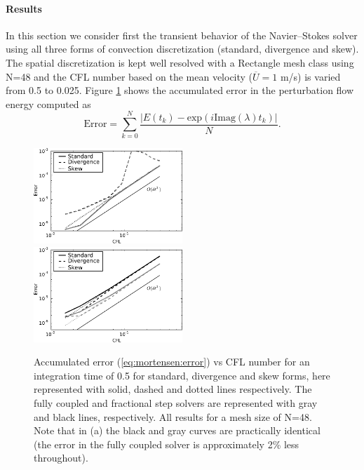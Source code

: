 \paragraph{Results}
In this section we consider first the transient behavior of the Navier--Stokes solver using all three forms of convection discretization (standard, divergence and skew). The spatial discretization is kept well resolved with a Rectangle mesh class using N=48 and the CFL number based on the mean velocity ($\overline{U}=1$ m/s) is varied from 0.5 to 0.025. Figure \ref{fig:mortensen:OS_init_cfl}  shows the accumulated error in the perturbation flow energy computed as
\begin{equation}
 \text{Error} = \sum_{k=0}^N \frac{|E(t_k)-\text{exp}(i \text{Imag}(\lambda) t_k)|}{N}.
 \label{eq:mortensen:error}
\end{equation}
\begin{figure}
 \includegraphics[width=0.5\textwidth]{chapters/mortensen/pdf/OS_init_cfl_1.pdf}
 \includegraphics[width=0.5\textwidth]{chapters/mortensen/pdf/OS_init_cfl_0.pdf}
 \caption{Accumulated error (\eqref{eq:mortensen:error}) vs CFL number for an integration time of 0.5 for standard, divergence and skew forms, here represented with solid, dashed and dotted lines respectively. The fully coupled and fractional step solvers are represented with gray and black lines, respectively. All results for a mesh size of N=48. Note that in (a) the black and gray curves are practically identical (the error in the fully coupled solver is approximately 2\% less throughout). }
\label{fig:mortensen:OS_init_cfl}
\end{figure}
